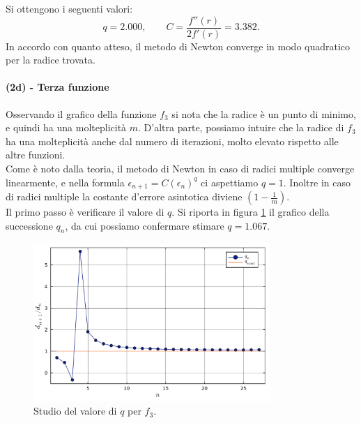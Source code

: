 \documentclass[letterpaper, 12pt]{article}
\begin{document}
Si ottengono i seguenti valori:
\begin{equation}
    q = 2.000,
    \qquad
    C = \frac{ f''(r)}{2 f'(r)} = 3.382.
\end{equation}
In accordo con quanto atteso, il metodo di Newton converge in modo quadratico per la radice trovata.

\paragraph{(2d) - Terza funzione}
Osservando il grafico della funzione $f_3$ si nota che la radice è un punto di minimo, e quindi ha una molteplicità
$m$. D'altra parte, possiamo intuire che la radice di $f_3$ ha una molteplicità anche dal numero di iterazioni,
molto elevato rispetto alle altre funzioni. \\
Come è noto dalla teoria, il metodo di Newton in caso di radici multiple converge linearmente, e nella formula
$ \epsilon_{n+1} = C (\epsilon_n)^q $ ci aspettiamo $q = 1$. Inoltre in caso di radici multiple
la costante d'errore asintotica diviene $(1-{\frac{1}{m}})$. \\

Il primo passo è verificare il valore di $q$. Si riporta in figura \ref{fig:es3_3_2_5} il grafico 
della successione $q_n$, da cui possiamo confermare stimare $q = 1.067$. \\

\begin{figure}[!ht]
    \centering
    \includegraphics[width=0.8\textwidth]{3323_q.pdf}
    \caption{Studio del valore di $q$ per $f_3$.}
    \label{fig:es3_3_2_5}
\end{figure}
\end{document}
